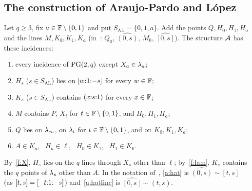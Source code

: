 \subsection{The construction of Araujo-Pardo and L\'opez}\label{ssec:al}
Let $q \ge 3$, fix $a \in \mathbb{F} \setminus \{0,1\}$ and put $S_{\mathrm{AL}} = \{0,1,a\}$. Add the points $Q, H_0, H_1, H_a$ and the lines $M, K_0, K_1, K_a$ (in~\cite{AL}: $Q_0$, $\widehat{(0,s)}$, $M_0$, $\widehat{[0,s]}$). The structure $\mathcal{A}$ has these incidences:
\begin{enumerate}[label=\textup{(A\arabic*)},leftmargin=3em]
\item\label{a:plane} every incidence of $\mathrm{PG}(2,q)$ except $X_a \in \lambda_a$;
\item\label{a:hat} $H_s$ ($s \in S_{\mathrm{AL}}$) lies on $[{w}{:}{1}{:}{-s}]$ for every $w \in \mathbb{F}$;
\item\label{a:hatline} $K_s$ ($s \in S_{\mathrm{AL}}$) contains $({x}{:}{s}{:}{1})$ for every $x \in \mathbb{F}$;
\item\label{a:M} $M$ contains $P$, $X_t$ for $t \in \mathbb{F} \setminus \{0,1\}$, and $H_0, H_1, H_a$;
\item\label{a:Q} $Q$ lies on $\lambda_\infty$, on $\lambda_t$ for $t \in \mathbb{F} \setminus \{0,1\}$, and on $K_0, K_1, K_a$;
\item\label{a:links} $A \in K_a$, \ $H_a \in \ell$, \ $H_0 \in K_1$, \ $H_1 \in K_0$.
\end{enumerate}
By~\ref{f:X}, $H_s$ lies on the $q$ lines through $X_s$ other than $\ell$; by~\ref{f:lam}, $K_s$ contains the $q$ points of $\lambda_s$ other than $A$. In the notation of~\cite{AL}, \ref{a:hat} is $\widehat{(0,s)} \sim [t,s]$ (as $[t,s] = [{-t}{:}{1}{:}{-s}]$) and~\ref{a:hatline} is $\widehat{[0,s]} \sim (t,s)$.

